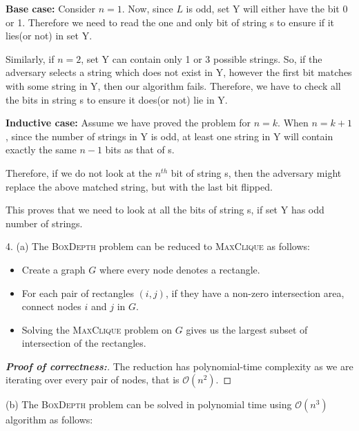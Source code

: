 \documentclass[assign]{article}
\begin{document}
\par \textbf{Base case:} Consider $n=1$. Now, since $L$ is odd, set Y will either have the bit 0 or 1. Therefore we need to read the one and only bit of string s to ensure if it lies(or not) in set Y. 
\par Similarly, if $n=2$, set Y can contain only 1 or 3 possible strings. So, if the adversary selects a string which does not exist in Y, however the first bit matches with some string in Y, then our algorithm fails. Therefore, we have to check all the bits in string s to ensure it does(or not) lie in Y.

\par \textbf{Inductive case:} Assume we have proved the problem for $n=k$. When $n = k+1$, since the number of strings in Y is odd, at least one string in Y will contain exactly the same $n-1$ bits as that of s. 
\par Therefore, if we do not look at the $n^{th}$ bit of string s, then the adversary might replace the above matched string, but with the last bit flipped. 

This proves that we need to look at all the bits of string s, if set Y has odd number of strings.

\vspace{10pt}

\par 4. (a) The \textsc{BoxDepth} problem can be reduced to \textsc{MaxClique} as follows:
\vspace{-5pt}
\begin{itemize}
  \addtolength{\itemsep}{-8pt}
  \item Create a graph $G$ where every node denotes a rectangle.
   \item For each pair of rectangles $(i,j)$, if they have a non-zero intersection area, connect nodes $i$ and $j$ in $G$.
   \item Solving the \textsc{MaxClique} problem on $G$ gives us the largest subset of intersection of the rectangles.
\end{itemize}

\begin{proof}[\textbf{Proof of correctness:}]
  The reduction has polynomial-time complexity as we are iterating over every pair of nodes, that is $\mathcal{O}(n^2)$.
\end{proof}

\par (b) The \textsc{BoxDepth} problem can be solved in polynomial time using $\mathcal{O}(n^3)$ algorithm as follows:
\end{document}
